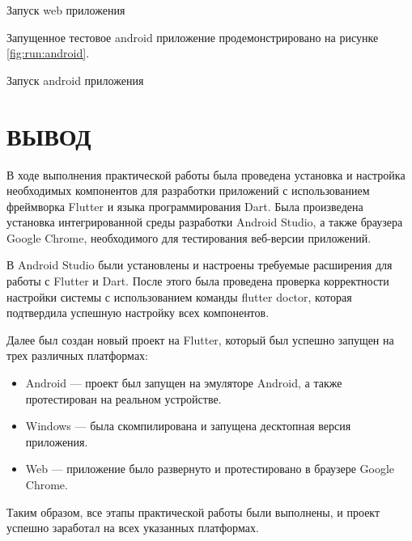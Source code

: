\begin{image}
	\caption{Запуск web приложения}
	\label{fig:run:web}
\end{image}
\clearpage

Запущенное тестовое android приложение
продемонстрировано на рисунке \ref{fig:run:android}.

\begin{image}
	\caption{Запуск android приложения}
	\label{fig:run:android}
\end{image}
\clearpage

\clearpage

\section*{ВЫВОД}

В ходе выполнения практической работы была проведена установка
и настройка необходимых компонентов для разработки приложений
с использованием фреймворка Flutter и языка программирования Dart.
Была произведена установка интегрированной среды разработки Android Studio,
а также браузера Google Chrome,
необходимого для тестирования веб-версии приложений.\par
В Android Studio были установлены и настроены требуемые расширения
для работы с Flutter и Dart.
После этого была проведена проверка корректности настройки системы
с использованием команды flutter doctor,
которая подтвердила успешную настройку всех компонентов.\par
Далее был создан новый проект на Flutter,
который был успешно запущен на трех различных платформах:

\begin{itemize}
	\item Android --- проект был запущен на эмуляторе Android,
		а также протестирован на реальном устройстве.
	\item Windows --- была скомпилирована
		и запущена десктопная версия приложения.
	\item Web --- приложение было развернуто
		и протестировано в браузере Google Chrome.
\end{itemize}

Таким образом, все этапы практической работы были выполнены, и проект успешно заработал на всех указанных платформах.


